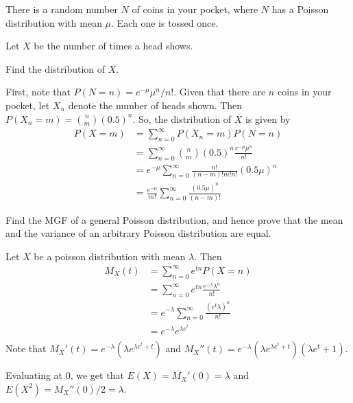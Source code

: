 \begin{problem}[Handout 10, \# 12]
  There is a random number \(N\) of coins in your pocket, where \(N\) has a
  Poisson distribution with mean \(\mu\). Each one is tossed once.

  \noindent Let \(X\) be the number of times a head shows.

  \noindent Find the distribution of \(X\).
\end{problem}
\begin{solution}
  First, note that $P(N=n)=e^{-\mu} \mu^n/n!$.  Given that there are $n$
  coins in your pocket, let $X_n$ denote the number of heads shown. Then
  $P(X_n = m) = \binom{n}{m} \left( 0.5 \right)^n$.  So, the distribution
  of $X$ is given by
  \begin{align*}
    P(X=m) &= \sum_{n=0}^\infty P(X_n = m) P(N=n) \\
           &= \sum_{n=0}^\infty \binom{n}{m} \left( 0.5 \right)^n \frac{e^{-\mu} \mu^n}{n!} \\
           &= e^{-\mu} \sum_{n=0}^\infty \frac{n!}{(n-m)!m!n!} (0.5 \mu)^n \\
           &= \frac{e^{-\mu}}{m!} \sum_{n=0}^\infty \frac{(0.5 \mu)^n}{(n-m)!}
  \end{align*}
\end{solution}
\newpage

\begin{problem}[Handout 10, \# 14]
  Find the MGF of a general Poisson distribution, and hence prove that the
  mean and the variance of an arbitrary Poisson distribution are equal.
\end{problem}
\begin{solution}
  Let $X$ be a poisson distribution with mean $\lambda$. Then
  \begin{align*}
    M_X(t) &= \sum_{n=0}^\infty e^{tn} P(X = n) \\
           &= \sum_{n=0}^\infty e^{tn} \frac{e^{-\lambda} \lambda^n}{n!} \\
           &= e^{-\lambda} \sum_{n=0}^\infty \frac{(e^t \lambda)^n}{n!} \\
           &= e^{-\lambda} e^{\lambda e^t} \\
  \end{align*}
  Note that
  $M_X'(t) = e^{-\lambda} \left(\lambda e^{\lambda e^t + t} \right)$ and
  $M_X''(t) = e^{-\lambda} \left(\lambda e^{\lambda e^t + t} \right)
  \left(\lambda e^t +1 \right)$.

  Evaluating at $0$, we get that $E(X) = M_X'(0) = \lambda$ and
  $E(X^2) = M_X''(0) /2= \lambda$.
\end{solution}
\newpage

